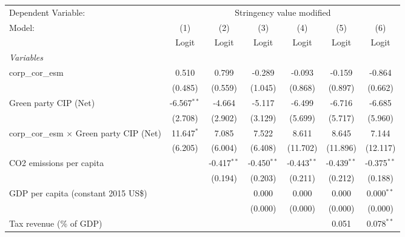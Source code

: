 
\begingroup
\centering
\begin{tabular}{lcccccc}
   \toprule
   Dependent Variable: & \multicolumn{6}{c}{Stringency value modified}\\
   Model:                                           & (1)           & (2)           & (3)           & (4)           & (5)           & (6)\\  
                                                    &  Logit        & Logit         & Logit         & Logit         & Logit         & Logit\\  
   \midrule
   \emph{Variables}\\
   corp\_cor\_esm                                   & 0.510         & 0.799         & -0.289        & -0.093        & -0.159        & -0.864\\   
                                                    & (0.485)       & (0.559)       & (1.045)       & (0.868)       & (0.897)       & (0.662)\\   
   Green party CIP (Net)                            & -6.567$^{**}$ & -4.664        & -5.117        & -6.499        & -6.716        & -6.685\\   
                                                    & (2.708)       & (2.902)       & (3.129)       & (5.699)       & (5.717)       & (5.960)\\   
   corp\_cor\_esm $\times$ Green party CIP (Net)    & 11.647$^{*}$  & 7.085         & 7.522         & 8.611         & 8.645         & 7.144\\   
                                                    & (6.205)       & (6.004)       & (6.408)       & (11.702)      & (11.896)      & (12.117)\\   
   CO2 emissions per capita                         &               & -0.417$^{**}$ & -0.450$^{**}$ & -0.443$^{**}$ & -0.439$^{**}$ & -0.375$^{**}$\\   
                                                    &               & (0.194)       & (0.203)       & (0.211)       & (0.212)       & (0.188)\\   
   GDP per capita (constant 2015 US\$)              &               &               & 0.000         & 0.000         & 0.000         & 0.000$^{**}$\\   
                                                    &               &               & (0.000)       & (0.000)       & (0.000)       & (0.000)\\   
   Tax revenue (\% of GDP)                          &               &               &               &               & 0.051         & 0.078$^{**}$\\   

\end{tabular}
